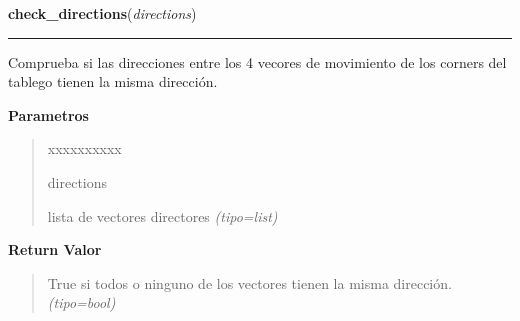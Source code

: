\hspace{.8\funcindent}\begin{boxedminipage}{\funcwidth}

    \raggedright \textbf{check\_directions}(\textit{directions})

    \vspace{-1.5ex}

    \rule{\textwidth}{0.5\fboxrule}
\setlength{\parskip}{2ex}
Comprueba si las direcciones entre los 4 vecores de movimiento de los corners del tablego tienen la misma dirección.

\setlength{\parskip}{1ex}
      \textbf{Parametros}
      \vspace{-1ex}

      \begin{quote}
        \begin{Ventry}{xxxxxxxxxx}

          \item[directions]


lista de vectores directores
            {\it (tipo=list)}

        \end{Ventry}

      \end{quote}

      \textbf{Return Valor}
    \vspace{-1ex}

      \begin{quote}

True si todos o ninguno de los vectores tienen la misma dirección.
      {\it (tipo=bool)}

      \end{quote}

    \end{boxedminipage}

    \label{src:check_goban_moved:check_goban_moved}

    \vspace{0.5ex}

